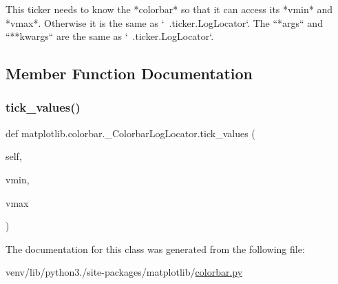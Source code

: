 \begin{DoxyVerb}This ticker needs to know the *colorbar* so that it can access
its *vmin* and *vmax*.  Otherwise it is the same as
`~.ticker.LogLocator`.  The ``*args`` and ``**kwargs`` are the
same as `~.ticker.LogLocator`.
\end{DoxyVerb}
 

\subsection{Member Function Documentation}
\mbox{\label{classmatplotlib_1_1colorbar_1_1__ColorbarLogLocator_a6754d2784893876b51cfc96648ae359f}} 
\subsubsection{\texorpdfstring{tick\+\_\+values()}{tick\_values()}}
{\footnotesize\ttfamily def matplotlib.\+colorbar.\+\_\+\+Colorbar\+Log\+Locator.\+tick\+\_\+values (\begin{DoxyParamCaption}\item[{}]{self,  }\item[{}]{vmin,  }\item[{}]{vmax }\end{DoxyParamCaption})}



The documentation for this class was generated from the following file\+:\begin{DoxyCompactItemize}
\item 
venv/lib/python3./site-\/packages/matplotlib/\hyperlink{colorbar_8py}{colorbar.\+py}\end{DoxyCompactItemize}
